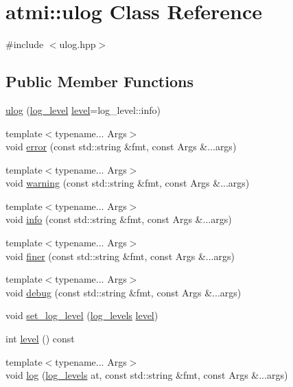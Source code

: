 \hypertarget{classatmi_1_1ulog}{\section{atmi\+:\+:ulog Class Reference}
\label{classatmi_1_1ulog}
}


{\ttfamily \#include $<$ulog.\+hpp$>$}

\subsection*{Public Member Functions}
\begin{DoxyCompactItemize}
\item 
\hyperlink{classatmi_1_1ulog_a52394015e2bcd098c9b6de0e173637e9}{ulog} (\hyperlink{group__logging_gaf9bdc466e66896621125b81d022264ca}{log\+\_\+level} \hyperlink{classatmi_1_1ulog_a75c3bf9fdf68677f5e2b096acdac737e}{level}=log\+\_\+level\+::info)
\item 
{\footnotesize template$<$typename... Args$>$ }\\void \hyperlink{classatmi_1_1ulog_a29e7f8215085533c0b4fb788545e9329}{error} (const std\+::string \&fmt, const Args \&...args)
\item 
{\footnotesize template$<$typename... Args$>$ }\\void \hyperlink{classatmi_1_1ulog_a48f44bc3d0265fdb3b8d464b78894ccc}{warning} (const std\+::string \&fmt, const Args \&...args)
\item 
{\footnotesize template$<$typename... Args$>$ }\\void \hyperlink{classatmi_1_1ulog_a21019f39119ed09e7d71672441456787}{info} (const std\+::string \&fmt, const Args \&...args)
\item 
{\footnotesize template$<$typename... Args$>$ }\\void \hyperlink{classatmi_1_1ulog_a23b79b2222930f4363d3150c39b49992}{finer} (const std\+::string \&fmt, const Args \&...args)
\item 
{\footnotesize template$<$typename... Args$>$ }\\void \hyperlink{classatmi_1_1ulog_a96d76b04d41c2a77a4c88e5d422ea5e5}{debug} (const std\+::string \&fmt, const Args \&...args)
\item 
void \hyperlink{classatmi_1_1ulog_a190ffba6f15d00c21578051ac5c7b035}{set\+\_\+log\+\_\+level} (\hyperlink{group__logging_gaf9bdc466e66896621125b81d022264ca}{log\+\_\+levels} \hyperlink{classatmi_1_1ulog_a75c3bf9fdf68677f5e2b096acdac737e}{level})
\item 
int \hyperlink{classatmi_1_1ulog_a75c3bf9fdf68677f5e2b096acdac737e}{level} () const 
\item 
{\footnotesize template$<$typename... Args$>$ }\\void \hyperlink{classatmi_1_1ulog_ad352992adc121dbdaf0428fd6f53125a}{log} (\hyperlink{group__logging_gaf9bdc466e66896621125b81d022264ca}{log\+\_\+levels} at, const std\+::string \&fmt, const Args \&...args)
\end{DoxyCompactItemize}


